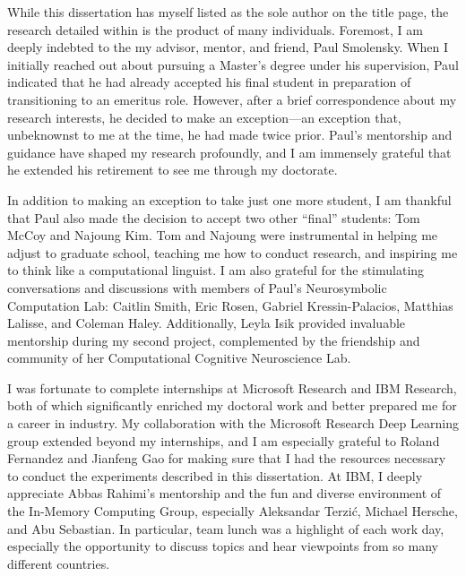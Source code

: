 
While this dissertation has myself listed as the sole author on the title page, the research detailed within is the product of many individuals. Foremost, I am deeply indebted to the my advisor, mentor, and friend, Paul Smolensky. When I initially reached out about pursuing a Master's degree under his supervision, Paul indicated that he had already accepted his final student in preparation of transitioning to an emeritus role. However, after a brief correspondence about my research interests, he decided to make an exception—an exception that, unbeknownst to me at the time, he had made twice prior. Paul's mentorship and guidance have shaped my research profoundly, and I am immensely grateful that he extended his retirement to see me through my doctorate.

In addition to making an exception to take just one more student, I am thankful that Paul also made the decision to accept two other ``final'' students: Tom McCoy and Najoung Kim. Tom and Najoung were instrumental in helping me adjust to graduate school, teaching me how to conduct research, and inspiring me to think like a computational linguist. I am also grateful for the stimulating conversations and discussions with members of Paul's Neurosymbolic Computation Lab: Caitlin Smith, Eric Rosen, Gabriel Kressin-Palacios, Matthias Lalisse, and Coleman Haley. Additionally, Leyla Isik provided invaluable mentorship during my second project, complemented by the friendship and community of her Computational Cognitive Neuroscience Lab.

I was fortunate to complete internships at Microsoft Research and IBM Research, both of which significantly enriched my doctoral work and better prepared me for a career in industry. My collaboration with the Microsoft Research Deep Learning group extended beyond my internships, and I am especially grateful to Roland Fernandez and Jianfeng Gao for making sure that I had the resources necessary to conduct the experiments described in this dissertation. At IBM, I deeply appreciate Abbas Rahimi’s mentorship and the fun and diverse environment of the In-Memory Computing Group, especially Aleksandar Terzić, Michael Hersche, and Abu Sebastian. In particular, team lunch was a highlight of each work day, especially the opportunity to discuss topics and hear viewpoints from so many different countries.

